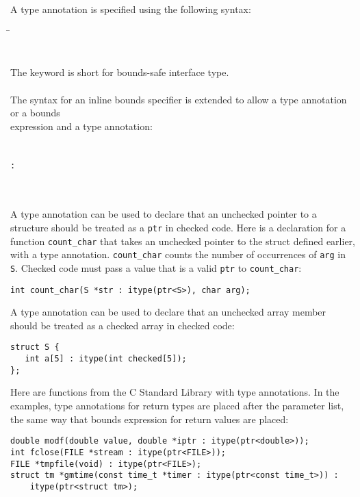 A type annotation is specified using the following syntax:

\begin{tabbing}
\= \\
\>\code{)}\\
\\
The keyword  is short for bounds-safe  interface type.
\\
\\
The syntax for an inline bounds specifier is extended to
allow a type annotation or a bounds\\
expression and a type annotation:
\\
\\
\\
\> \lstinline|:|  \\
\>\code{:}  \\
\>\code{:}   \\
\>\code{:}  
\end{tabbing}

A type annotation can be used to declare that an unchecked
pointer to a structure should be treated as a \lstinline+ptr+ in
checked code. Here is a declaration for a function
\lstinline+count_char+ that takes
an unchecked pointer to the struct  defined earlier,
with a type annotation. \lstinline+count_char+ counts the number
of occurrences of \lstinline+arg+ in \lstinline+S+. Checked code must pass a
value that is a valid \lstinline+ptr+ to \lstinline+count_char+:
\begin{lstlisting}
int count_char(S *str : itype(ptr<S>), char arg);
\end{lstlisting}
A type annotation can be used to declare that an unchecked array member should
be treated as a checked array in checked code:
\begin{lstlisting}
struct S {
   int a[5] : itype(int checked[5]);
};
\end{lstlisting}

Here are functions from the C Standard Library with type annotations.
In the examples, type annotations for return types are placed 
after the parameter list, the same way that bounds expression for
return values are placed:
\begin{lstlisting}
double modf(double value, double *iptr : itype(ptr<double>));
int fclose(FILE *stream : itype(ptr<FILE>));
FILE *tmpfile(void) : itype(ptr<FILE>);
struct tm *gmtime(const time_t *timer : itype(ptr<const time_t>)) :
    itype(ptr<struct tm>);
\end{lstlisting}

